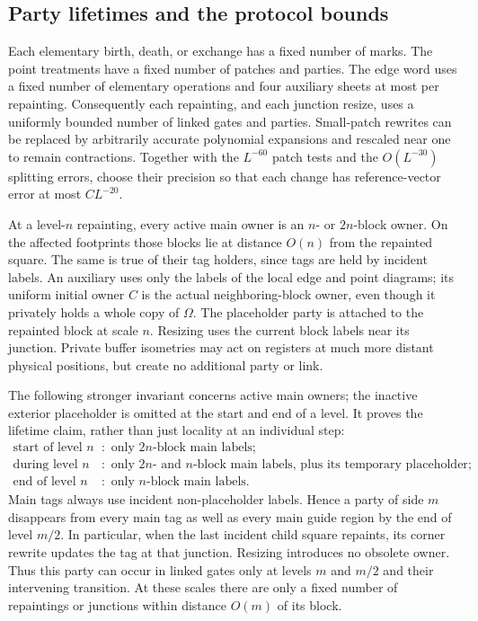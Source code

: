 \documentclass[11pt]{article}
\numberwithin{equation}{section}
\theoremstyle{definition}
\theoremstyle{remark}
\begin{document}
\subsection{Party lifetimes and the protocol bounds}

Each elementary birth, death, or exchange has a fixed number of
marks.  The point treatments have a fixed number of patches and
parties.  The edge word uses a fixed number of elementary operations
and four auxiliary sheets at most per repainting.  Consequently each
repainting, and each junction resize, uses a uniformly bounded
number of linked gates and parties.  Small-patch rewrites can be
replaced by arbitrarily accurate polynomial expansions and rescaled
near one to remain contractions.  Together with the $L^{-60}$ patch
tests and the $O(L^{-30})$ splitting errors, choose their precision
so that each change has reference-vector error at most $C L^{-20}$.

At a level-$n$ repainting, every active main owner is an $n$- or
$2n$-block owner.  On the affected footprints those blocks lie at
distance $O(n)$ from the repainted square.  The same is true of
their tag holders, since tags are held by incident labels.  An
auxiliary uses only the labels of the local edge and point diagrams;
its uniform initial owner $C$ is the actual neighboring-block owner,
even though it privately holds a whole copy of $\Omega$.  The
placeholder party is attached to the repainted block at scale $n$.
Resizing uses the current block labels near its junction.  Private
buffer isometries may act on registers at much more distant physical
positions, but create no additional party or link.

The following stronger invariant concerns active main owners; the
inactive exterior placeholder is omitted at the start and end of a
level. It proves the lifetime claim, rather than just locality at an
individual step:
\begin{equation}
 \begin{aligned}
  \text{start of level }n &: \text{ only }2n\text{-block main labels};\\
  \text{during level }n &: \text{ only }2n\text{- and }n\text{-block main labels,
       plus its temporary placeholder};\\
  \text{end of level }n &: \text{ only }n\text{-block main labels}.
 \end{aligned}
 \label{eq:geometry-active-labels}
\end{equation}
Main tags always use incident non-placeholder labels.  Hence a party
of side $m$ disappears from every main tag as well as every main
guide region by the end of level $m/2$.  In particular, when the last
incident child square repaints, its corner rewrite updates the tag
at that junction.  Resizing introduces no obsolete owner.  Thus
this party can occur in linked gates only at levels $m$ and $m/2$
and their intervening transition.  At these scales there are only
a fixed number of repaintings or junctions within distance $O(m)$
of its block.
\end{document}
